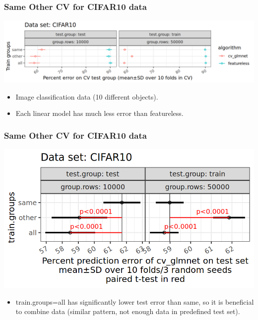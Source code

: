 \documentclass{beamer}
\begin{document}
\begin{frame}[fragile]
  \frametitle{Same Other CV for CIFAR10 data}
  \includegraphics[width=\textwidth]{CIFAR10_error_glmnet_featureless_mean_SD.png}
  \begin{itemize}
  \item Image classification data (10 different objects).
  \item Each linear model has much less error than featureless.
  \end{itemize}
\end{frame}

\begin{frame}
  \frametitle{Same Other CV for CIFAR10 data}
  \includegraphics[width=\textwidth]{CIFAR10_error_glmnet_sizes_mean_SD_pvalue.png}
  \begin{itemize}
  \item train.groups=all has significantly
    lower test error than same, so it is beneficial to combine data
    (similar pattern, not enough data in predefined test set).
  \end{itemize}
\end{frame}
\end{document}
